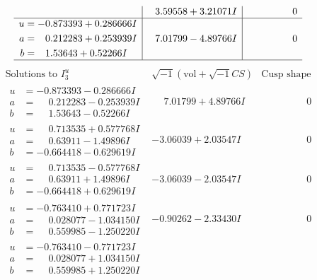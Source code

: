 \documentclass[1p]{elsarticle_modified}
\theoremstyle{definition}
\newcommand{\I}{\sqrt{-1}}
\begin{document}
$$\begin{array}{c|c|c}
 & \phantom{-}3.59558 + 3.21071 I & \phantom{-0.000000 } 0 \\ \hline\begin{aligned}
u &= -0.873393 + 0.286666 I \\
a &= \phantom{-}0.212283 + 0.253939 I \\
b &= \phantom{-}1.53643 + 0.52266 I\end{aligned}
 & \phantom{-}7.01799 - 4.89766 I & \phantom{-0.000000 } 0\\
 \hline 
 \end{array}$$\newpage$$\begin{array}{c|c|c}  
\text{Solutions to }I^u_{3}& \I (\text{vol} + \sqrt{-1}CS) & \text{Cusp shape}\\
 \hline 
\begin{aligned}
u &= -0.873393 - 0.286666 I \\
a &= \phantom{-}0.212283 - 0.253939 I \\
b &= \phantom{-}1.53643 - 0.52266 I\end{aligned}
 & \phantom{-}7.01799 + 4.89766 I & \phantom{-0.000000 } 0 \\ \hline\begin{aligned}
u &= \phantom{-}0.713535 + 0.577768 I \\
a &= \phantom{-}0.63911 - 1.49896 I \\
b &= -0.664418 - 0.629619 I\end{aligned}
 & -3.06039 + 2.03547 I & \phantom{-0.000000 } 0 \\ \hline\begin{aligned}
u &= \phantom{-}0.713535 - 0.577768 I \\
a &= \phantom{-}0.63911 + 1.49896 I \\
b &= -0.664418 + 0.629619 I\end{aligned}
 & -3.06039 - 2.03547 I & \phantom{-0.000000 } 0 \\ \hline\begin{aligned}
u &= -0.763410 + 0.771723 I \\
a &= \phantom{-}0.028077 - 1.034150 I \\
b &= \phantom{-}0.559985 - 1.250220 I\end{aligned}
 & -0.90262 - 2.33430 I & \phantom{-0.000000 } 0 \\ \hline\begin{aligned}
u &= -0.763410 - 0.771723 I \\
a &= \phantom{-}0.028077 + 1.034150 I \\
b &= \phantom{-}0.559985 + 1.250220 I\end{aligned}

\end{array}$$
\end{document}
